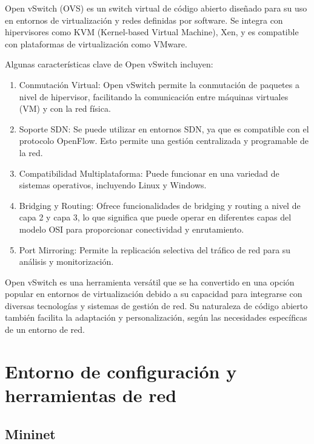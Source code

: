 \documentclass[a4paper, 12pt]{book}
\begin{document}
	Open vSwitch (OVS) es un switch virtual de código abierto diseñado para su uso en entornos de virtualización y redes definidas por software. Se integra con hipervisores como KVM (Kernel-based Virtual Machine), Xen, y es compatible con plataformas de virtualización como VMware.
	
	Algunas características clave de Open vSwitch incluyen:
	
	\begin{enumerate}
		\item Conmutación Virtual: Open vSwitch permite la conmutación de paquetes a nivel de hipervisor, facilitando la comunicación entre máquinas virtuales (VM) y con la red física.
		
		
		\item Soporte SDN: Se puede utilizar en entornos SDN, ya que es compatible con el protocolo OpenFlow. Esto permite una gestión centralizada y programable de la red.
		
		\item Compatibilidad Multiplataforma: Puede funcionar en una variedad de sistemas operativos, incluyendo Linux y Windows.
		
		\item Bridging y Routing: Ofrece funcionalidades de bridging y routing a nivel de capa 2 y capa 3, lo que significa que puede operar en diferentes capas del modelo OSI para proporcionar conectividad y enrutamiento.
		
		\item Port Mirroring: Permite la replicación selectiva del tráfico de red para su análisis y monitorización.
		
	\end{enumerate}
	
	Open vSwitch es una herramienta versátil que se ha convertido en una opción popular en entornos de virtualización debido a su capacidad para integrarse con diversas tecnologías y sistemas de gestión de red. Su naturaleza de código abierto también facilita la adaptación y personalización, según las necesidades específicas de un entorno de red.
	
	\section{Entorno de configuración y herramientas de red}
	\subsection{Mininet} 
	\label{sec:mininet}
	
\end{document}
